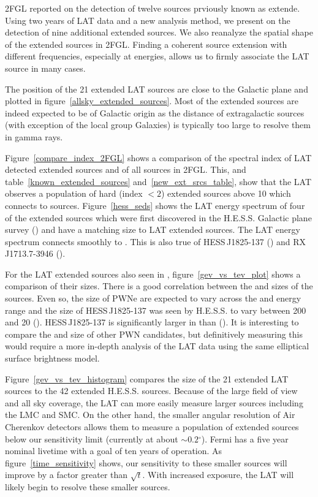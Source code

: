 \documentclass[12pt,preprint]{aastex}
\newcommand{\gev}{\text{GeV}\xspace}
\newcommand{\tev}{\text{TeV}\xspace}
\renewcommand{\deg}{\ensuremath{^\circ}\xspace}
\renewcommand{\approx}{\sim\!\xspace}
\begin{document}
2FGL reported on the detection of twelve sources
prviously known as extende. Using
two years of LAT data and a new analysis method, we present on 
the detection of nine additional extended sources. We also reanalyze
the spatial shape of the extended sources in 2FGL.  Finding a coherent
source extension with different frequencies, especially at \tev energies,
allows us to firmly associate the LAT source in many cases.

The position of the 21 extended LAT sources are close to the Galactic
plane and plotted in figure~\ref{allsky_extended_sources}.  Most of the
extended sources are indeed expected to be of Galactic origin as the
distance of extragalactic sources (with exception of the local group
Galaxies) is typically too large to resolve them in gamma rays.


Figure~\ref{compare_index_2FGL} shows a comparison of the spectral index
of LAT detected extended sources and of all sources in 2FGL. This, and
table~\ref{known_extended_sources} and~\ref{new_ext_srcs_table},
show that the LAT observes a population of hard (index $<2$)
extended sources above 10 \gev which connects to \tev sources.
Figure~\ref{hess_seds} shows the LAT energy spectrum of four of the
extended sources which were first discovered in the H.E.S.S. Galactic
plane survey (\cite{hess_plane_survey}) and have a matching size to LAT
extended sources.  The LAT energy spectrum connects smoothly to \tev.
This is also true of HESS\,J1825-137 (\cite{fermi_hess_j1825}) and RX
J1713.7-3946 (\cite{rx_j1713_lat}). 

For the LAT extended sources also seen in \tev,
figure~\ref{gev_vs_tev_plot} shows a comparison of their sizes.  There is
a good correlation between the \gev and \tev sizes of the sources. Even
so, the size of PWNe are expected to vary across the \gev and \tev energy
range and the size of HESS\,J1825-137 was seen by H.E.S.S. to vary
between 200 \gev and 20 \tev (\cite{energy_dependent_hess_j1825}).
HESS\,J1825-137 is significantly larger in \gev than \tev
(\cite{fermi_hess_j1825}).  It is interesting to compare the \gev and
\tev size of other PWN candidates, but definitively measuring this 
would require a more in-depth analysis of the LAT data using the same 
elliptical surface brightness model.

Figure~\ref{gev_vs_tev_histogram} compares the size of the 21 extended
LAT sources to the 42 extended H.E.S.S. sources.  Because of the large
field of view and all sky coverage, the LAT can more easily measure
larger sources including the LMC and SMC.  On the other hand, the smaller
angular resolution of Air Cherenkov detectors allows them to measure a
population of extended sources below our sensitivity limit (currently at
about $\approx0.2\deg$).  Fermi has a five year nominal livetime with a
goal of ten years of operation.  As figure~\ref{time_sensitivity} shows,
our sensitivity to these smaller sources will improve by a factor greater
than $\sqrt{t}$.  With increased exposure, the LAT will likely begin to
resolve these smaller \tev sources.
\end{document}
